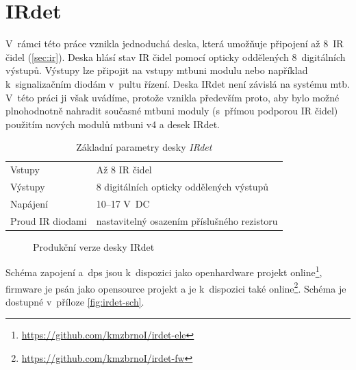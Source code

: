 \newpage
\section{IRdet} \label{sec:irdet}

V~rámci této práce vznikla jednoduchá deska, která umožňuje připojení až 8~IR
čidel (\ref{sec:ir}). Deska hlásí stav IR čidel pomocí opticky oddělených
8~digitálních výstupů. Výstupy lze připojit na vstupy \gls{mtbuni}
modulu nebo například k~signalizačním diodám v~pultu řízení.
Deska IRdet není závislá na systému \gls{mtb}. V~této práci ji
však uvádíme, protože vznikla především proto, aby bylo možné plnohodnotně
nahradit současné \gls{mtbuni} moduly (s~přímou podporou IR čidel) použitím
nových modulů \gls{mtbuni} v4 a desek IRdet.

\begin{table}[h]
	\begin{tabularx}{\textwidth}{lX}
		\toprule
		Vstupy & Až 8 IR čidel \\
		Výstupy & 8 digitálních opticky oddělených výstupů \\
		Napájení & 10–17 V~DC \\
		Proud IR diodami & nastavitelný osazením příslušného rezistoru \\
		\bottomrule
	\end{tabularx}
	\caption{Základní parametry desky \textit{IRdet}}
	\label{tab:mtbuni-params}
\end{table}

\begin{figure}[ht!]
\caption{Produkční verze desky IRdet}
\label{fig:irdet}
\end{figure}

Schéma zapojení a~\gls{dps} jsou k~dispozici jako open\-hard\-ware
projekt online\footnote{\url{https://github.com/kmzbrnoI/irdet-ele}}, firmware
je psán jako opensource projekt a je k~dispozici také
online\footnote{\url{https://github.com/kmzbrnoI/irdet-fw}}.
Schéma je dostupné v~příloze \ref{fig:irdet-sch}.

